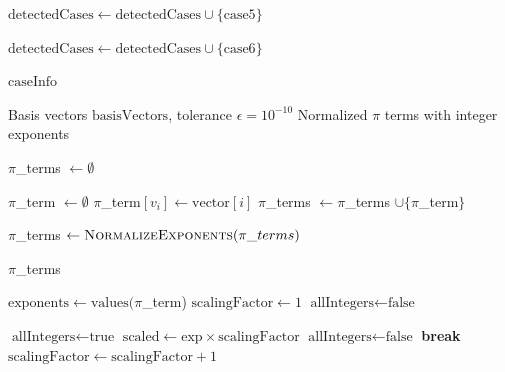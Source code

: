 \documentclass[
	11pt, %
	fleqn, %
	a4paper, %
]{LegrandOrangeBook}
\begin{document}
\begin{algorithm}[H]
\begin{algorithmic}[1]
    \State {}
        \State $\text{detectedCases} \gets \text{detectedCases} \cup \{\text{case5}\}$
    \EndIf

    \State {}
        \State $\text{detectedCases} \gets \text{detectedCases} \cup \{\text{case6}\}$
    \EndIf

    \State \Return $\text{caseInfo}$
\EndFunction
\end{algorithmic}
\end{algorithm}

\begin{algorithm}[H]
\caption{$\pi$ Terms Generation with Integer Normalization}
\begin{algorithmic}[1]
\Require Basis vectors $\text{basisVectors}$, tolerance $\epsilon = 10^{-10}$
\Ensure Normalized $\pi$ terms with integer exponents

    \State $\pi$\_terms $\gets \emptyset$

        \State $\pi$\_term $\gets \emptyset$
                \State $\pi$\_term$[v_i] \gets \text{vector}[i]$
            \EndIf
        \EndFor
        \State $\pi$\_terms $\gets \pi$\_terms $\cup \{\pi$\_term$\}$
    \EndFor

    \State {}
    \State $\pi$\_terms $\gets \Call{NormalizeExponents}{\pi\_terms}$

    \State \Return $\pi$\_terms
\EndFunction

        \State $\text{exponents} \gets \text{values}(\pi$\_term)
        \State $\text{scalingFactor} \gets 1$
        \State $\text{allIntegers} \gets \text{false}$

            \State $\text{allIntegers} \gets \text{true}$
                \State $\text{scaled} \gets \text{exp} \times \text{scalingFactor}$
                    \State $\text{allIntegers} \gets \text{false}$
                    \State \textbf{break}
                \EndIf
            \EndFor
                \State $\text{scalingFactor} \gets \text{scalingFactor} + 1$
            \EndIf
        \EndWhile


\end{algorithmic}
\end{algorithm}
\end{document}
